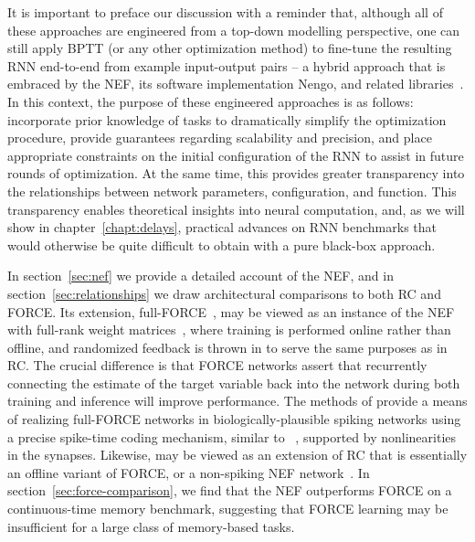 It is important to preface our discussion with a reminder that, although all of these approaches are engineered from a top-down modelling perspective, one can still apply BPTT (or any other optimization method) to fine-tune the resulting RNN end-to-end from example input-output pairs -- a hybrid approach that is embraced by the NEF, its software implementation Nengo, and related libraries~\citep{rasmussen2018nengodl, hazan2018bindsnet}.
In this context, the purpose of these engineered approaches is as follows: incorporate prior knowledge of tasks to dramatically simplify the optimization procedure, provide guarantees regarding scalability and precision, and place appropriate constraints on the initial configuration of the RNN to assist in future rounds of optimization.
At the same time, this provides greater transparency into the relationships between network parameters, configuration, and function.
This transparency enables theoretical insights into neural computation, and, as we will show in chapter~\ref{chapt:delays}, practical advances on RNN benchmarks that would otherwise be quite difficult to obtain with a pure black-box approach.

In section~\ref{sec:nef} we provide a detailed account of the NEF, and in section~\ref{sec:relationships} we draw architectural comparisons to both RC and FORCE.
Its extension, full-FORCE~\citep{depasquale2018full}, may be viewed as an instance of the NEF with full-rank weight matrices~\citep{tripp2006neural}, where training is performed online rather than offline, and randomized feedback is thrown in to serve the same purposes as in RC.
The crucial difference is that FORCE networks assert that recurrently connecting the estimate of the target variable back into the network during both training and inference will improve performance. 
The methods of \citet{thalmeier2016learning} provide a means of realizing full-FORCE networks in biologically-plausible spiking networks using a precise spike-time coding mechanism, similar to ~\citet{boerlin2013predictive}, supported by nonlinearities in the synapses.
Likewise, \citet{jaeger2014controlling} may be viewed as an extension of RC that is essentially an offline variant of FORCE, or a non-spiking NEF network~\citep{aubin2017}.
In section~\ref{sec:force-comparison}, we find that the NEF %
 outperforms FORCE on a continuous-time memory benchmark, suggesting that FORCE learning may be insufficient for a large class of memory-based tasks.


